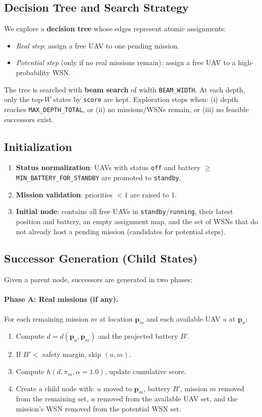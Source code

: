 \subsection*{Decision Tree and Search Strategy}
We explore a \textbf{decision tree} whose edges represent atomic assignments:
\begin{itemize}
  \item \emph{Real step}: assign a free UAV to one pending mission.
  \item \emph{Potential step} (only if no real missions remain): assign a free UAV to a high-probability WSN.
\end{itemize}
The tree is searched with \textbf{beam search} of width \texttt{BEAM\_WIDTH}. At each depth,
only the top-\(W\) states by \texttt{score} are kept. Exploration stops when:
(i) depth reaches \texttt{MAX\_DEPTH\_TOTAL}, or (ii) no missions/WSNs remain, or (iii) no feasible
successors exist.

\subsection*{Initialization}
\begin{enumerate}
  \item \textbf{Status normalization}: UAVs with status \texttt{off} and battery
        \(\ge\) \texttt{MIN\_BATTERY\_FOR\_STANDBY} are promoted to \texttt{standby}.
  \item \textbf{Mission validation}: priorities \(<1\) are raised to 1.
  \item \textbf{Initial node}: contains all free UAVs in \texttt{standby}/\texttt{running}, their
        latest position and battery, an empty assignment map, and the set of WSNs that do not
        already host a pending mission (candidates for potential steps).
\end{enumerate}

\subsection*{Successor Generation (Child States)}
Given a parent node, successors are generated in two phases:

\paragraph{Phase A: Real missions (if any).}
For each remaining mission \(m\) at location \(\mathbf{p}_m\) and each available UAV \(u\) at \(\mathbf{p}_u\):
\begin{enumerate}
  \item Compute \(d = d(\mathbf{p}_u,\mathbf{p}_m)\) and the projected battery \(B'\).
  \item If \(B' <\) safety margin, skip \((u,m)\).
  \item Compute \(h(d,\pi_m,\alpha{=}1.0)\), update cumulative score.
  \item Create a child node with: \(u\) moved to \(\mathbf{p}_m\), battery \(B'\), mission \(m\) removed
        from the remaining set, \(u\) removed from the available UAV set, and the mission's WSN
        removed from the potential WSN set.
\end{enumerate}

